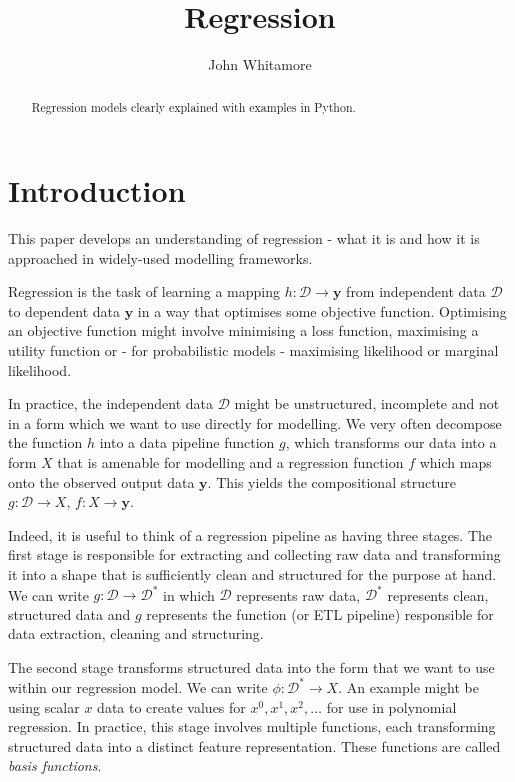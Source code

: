 \documentclass[11pt]{article}
\title{\textbf{Regression}}
\author{John Whitamore}
\date{}
\begin{document}
	
	\maketitle
	
	\begin{abstract}
		Regression models clearly explained with examples in Python.
	\end{abstract}
	
	\section{Introduction}
	
	This paper develops an understanding of regression - what it is and how it is approached in widely-used modelling frameworks.
	
	Regression is the task of learning a mapping $h: \mathcal{D} \rightarrow \boldsymbol{y}$ from independent data $\mathcal{D}$ to dependent data $\boldsymbol{y}$ in a way that optimises some objective function. Optimising an objective function might involve minimising a loss function, maximising a utility function or - for probabilistic models - maximising likelihood or marginal likelihood.
	
	In practice, the independent data $\mathcal{D}$ might be unstructured, incomplete and not in a form which we want to use directly for modelling. We very often decompose the function $h$ into a data pipeline function $g$, which transforms our data into a form $X$ that is amenable for modelling and a regression function $f$ which maps onto the observed output data $\boldsymbol{y}$. This yields the compositional structure $g: \mathcal{D} \rightarrow X$, $f: X \rightarrow \boldsymbol{y}$.
	
	Indeed, it is useful to think of a regression pipeline as having three stages. The first stage is responsible for extracting and collecting raw data and transforming it into a shape that is sufficiently clean and structured for the purpose at hand. We can write $g: \mathcal{D} \rightarrow \mathcal{D}^{*}$ in which $\mathcal{D}$ represents raw data, $\mathcal{D}^{*}$ represents clean, structured data and $g$ represents the function (or ETL pipeline) responsible for data extraction, cleaning and structuring.
	
	The second stage transforms structured data into the form that we want to use within our regression model. We can write $\phi: \mathcal{D}^{*} \rightarrow X$. An example might be using scalar $x$ data to create values for $x^{0}, x^{1}, x^{2}, \dots$ for use in polynomial regression. In practice, this stage involves multiple functions, each transforming structured data into a distinct feature representation. These functions are called \emph{basis functions}.
	
\end{document}
